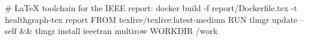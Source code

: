 # LaTeX toolchain for the IEEE report: docker build -f report/Dockerfile.tex -t healthgraph-tex report
FROM texlive/texlive:latest-medium
RUN tlmgr update --self && tlmgr install ieeetran multirow
WORKDIR /work
